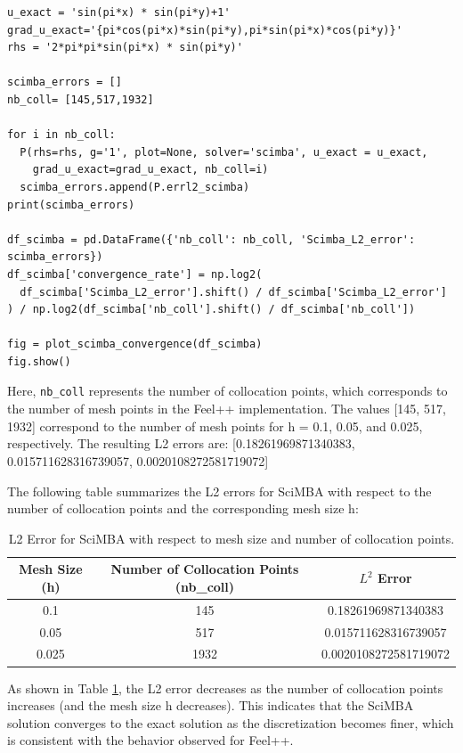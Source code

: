 \documentclass{article}
\begin{document}
\begin{verbatim}
u_exact = 'sin(pi*x) * sin(pi*y)+1'
grad_u_exact='{pi*cos(pi*x)*sin(pi*y),pi*sin(pi*x)*cos(pi*y)}'
rhs = '2*pi*pi*sin(pi*x) * sin(pi*y)'

scimba_errors = []
nb_coll= [145,517,1932]

for i in nb_coll:
  P(rhs=rhs, g='1', plot=None, solver='scimba', u_exact = u_exact,
    grad_u_exact=grad_u_exact, nb_coll=i)
  scimba_errors.append(P.errl2_scimba)
print(scimba_errors)

df_scimba = pd.DataFrame({'nb_coll': nb_coll, 'Scimba_L2_error': scimba_errors})
df_scimba['convergence_rate'] = np.log2(
  df_scimba['Scimba_L2_error'].shift() / df_scimba['Scimba_L2_error']
) / np.log2(df_scimba['nb_coll'].shift() / df_scimba['nb_coll'])

fig = plot_scimba_convergence(df_scimba)
fig.show()
\end{verbatim}

Here, \texttt{nb\_coll} represents the number of collocation points, which corresponds to the number of mesh points in the Feel++ implementation. The values [145, 517, 1932] correspond to the number of mesh points for h = 0.1, 0.05, and 0.025, respectively. The resulting L2 errors are:
[0.18261969871340383, 0.015711628316739057, 0.0020108272581719072]

The following table summarizes the L2 errors for SciMBA with respect to the number of collocation points and the corresponding mesh size h:

\begin{table}[h!]
    \centering
    \begin{tabular}{ccc}
\toprule
        Mesh Size (h) & Number of Collocation Points (nb_coll) & $L^2$ Error \\
        \midrule
        0.1   & 145  & 0.18261969871340383 \\
        0.05  & 517  & 0.015711628316739057 \\
        0.025 & 1932 & 0.0020108272581719072 \\
\bottomrule
    \end{tabular}
    \caption{L2 Error for SciMBA with respect to mesh size and number of collocation points.}
    \label{tab:scimba_l2_error}
\end{table}

As shown in Table \ref{tab:scimba_l2_error}, the L2 error decreases as the number of collocation points increases (and the mesh size h decreases). This indicates that the SciMBA solution converges to the exact solution as the discretization becomes finer, which is consistent with the behavior observed for Feel++.
\end{document}
